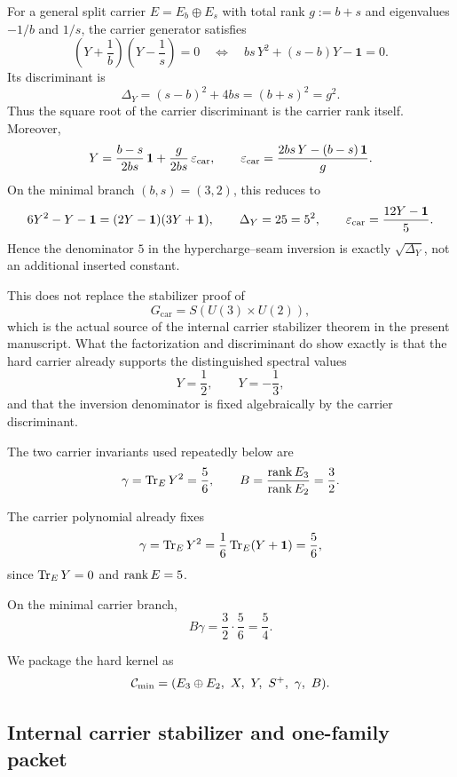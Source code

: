 
\begin{remark}\label{rem:carrier-discriminant}
For a general split carrier $E=E_b\oplus E_s$ with total rank $g:=b+s$ and eigenvalues $-1/b$ and $1/s$, the carrier generator satisfies
\[
\left(Y+\frac{1}{b}\right)\left(Y-\frac{1}{s}\right)=0
\quad\Longleftrightarrow\quad
bs\,Y^2+(s-b)Y-\mathbf 1=0.
\]
Its discriminant is
\[
\Delta_Y=(s-b)^2+4bs=(b+s)^2=g^2.
\]
Thus the square root of the carrier discriminant is the carrier rank itself. Moreover,
\[
Y=\frac{b-s}{2bs}\,\mathbf 1+\frac{g}{2bs}\,\varepsilon_{\mathrm{car}},
\qquad
\varepsilon_{\mathrm{car}}=\frac{2bs\,Y-(b-s)\,\mathbf 1}{g}.
\]
On the minimal branch $(b,s)=(3,2)$, this reduces to
\[
6Y^2-Y-\mathbf 1=(2Y-\mathbf 1)(3Y+\mathbf 1),
\qquad
\Delta_Y=25=5^2,
\qquad
\varepsilon_{\mathrm{car}}=\frac{12Y-\mathbf 1}{5}.
\]
Hence the denominator $5$ in the hypercharge--seam inversion is exactly $\sqrt{\Delta_Y}$, not an additional inserted constant.

This does not replace the stabilizer proof of
\[
G_{\mathrm{car}}=S(U(3)\times U(2)),
\]
which is the actual source of the internal carrier stabilizer theorem in the present manuscript.
What the factorization and discriminant do show exactly is that the hard carrier already supports the distinguished spectral values
\[
Y=\frac{1}{2},
\qquad
Y=-\frac{1}{3},
\]
and that the inversion denominator is fixed algebraically by the carrier discriminant.
\end{remark}

The two carrier invariants used repeatedly below are
\[
\gamma=\operatorname{Tr}_EY^2=\frac56,
\qquad
B=\frac{\operatorname{rank} E_3}{\operatorname{rank} E_2}=\frac32.
\]
\begin{corollary}
The carrier polynomial already fixes
\[
\gamma=\operatorname{Tr}_EY^2=\frac16\operatorname{Tr}_E(Y+\mathbf 1)=\frac56,
\]
since $\operatorname{Tr}_EY=0$ and $\operatorname{rank} E=5$.
\end{corollary}

\begin{corollary}
\label{cor:minimal-carrier-compression}
On the minimal carrier branch,
\[
B\gamma=\frac32\cdot\frac56=\frac54.
\]
\end{corollary}

We package the hard kernel as
\[
\Cmin=(E_3\oplus E_2,\ X,\ Y,\ S^+,\ \gamma,\ B).
\]

\subsection{Internal carrier stabilizer and one-family packet}

